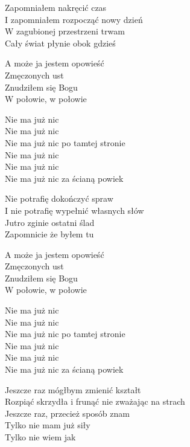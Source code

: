 \begin{text}
    Zapomniałem nakręcić czas\\
    I zapomniałem rozpocząć nowy dzień\\
    W zagubionej przestrzeni trwam\\
    Cały świat płynie obok gdzieś

    A może ja jestem opowieść\\
    Zmęczonych ust\\
    Znudziłem się Bogu\\
    W połowie, w połowie

    Nie ma już nic\\
    Nie ma już nic\\
    Nie ma już nic po tamtej stronie\\
    Nie ma już nic\\
    Nie ma już nic\\
    Nie ma już nic za ścianą powiek

    Nie potrafię dokończyć spraw\\
    I nie potrafię wypełnić własnych słów\\
    Jutro zginie ostatni ślad\\
    Zapomnicie że byłem tu

    A może ja jestem opowieść\\
    Zmęczonych ust\\
    Znudziłem się Bogu\\
    W połowie, w połowie

    Nie ma już nic\\
    Nie ma już nic\\
    Nie ma już nic po tamtej stronie\\
    Nie ma już nic\\
    Nie ma już nic\\
    Nie ma już nic za ścianą powiek

    Jeszcze raz mógłbym zmienić kształt\\
    Rozpiąć skrzydła i frunąć nie zważając na strach\\
    Jeszcze raz, przecież sposób znam\\
    Tylko nie mam już siły\\
    Tylko nie wiem jak
\end{text}

